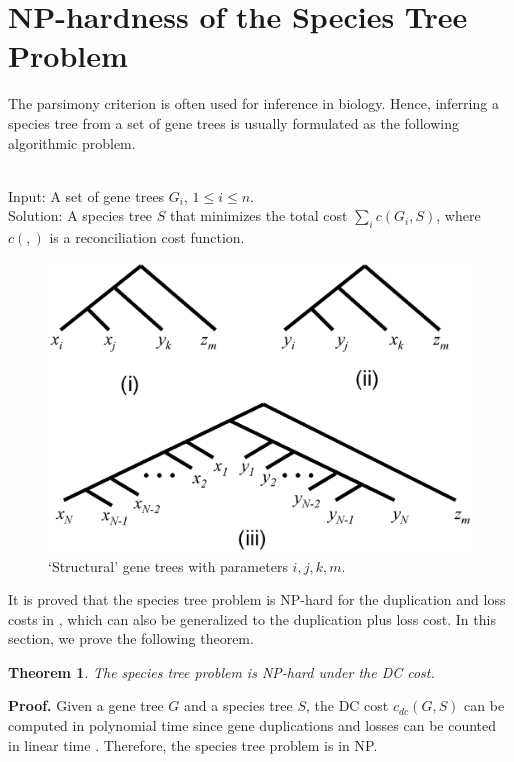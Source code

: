 \documentclass[9.5pt,journal,letterpaper,compsoc]{IEEEtran}
\newtheorem{theorem}{\bf Theorem}[section]
\begin{document}
\section{NP-hardness of the Species Tree Problem}

The parsimony criterion is often used for inference  in biology.
Hence, inferring  a species tree from  a set of gene trees is
usually formulated as the following algorithmic problem.

\\
{\sc Input}: A set of gene trees $G_i$, $1\leq i\leq n$.\\
{\sc Solution}: A species tree $S$ that minimizes the total cost
    $\sum_{i} c(G_i, S)$, where $c( , )$ is a reconciliation cost function.

\begin{figure}[t!]
\begin{center}
\includegraphics[width=0.9\columnwidth]{Figure4}
\end{center}
\caption{`Structural' gene trees with parameters $i, j, k, m$.}
\label{Gaget_Trees}
\end{figure}

It is proved that the species tree problem is NP-hard for the
duplication and loss costs in \cite{Ma_SIAMComput_01}, which can
also be generalized to the duplication plus loss cost. In this
section, we prove the following theorem.



\begin{theorem}
The species tree problem is NP-hard under the DC cost.
\end{theorem}
{\bf Proof.} Given a gene tree $G$ and a species tree $S$,
the DC cost $c_{dc}(G, S)$ can be
computed in polynomial time since gene duplications and
losses can be  counted in linear time \cite{Zh97}.
Therefore,  the species tree problem is in NP.
\end{document}
